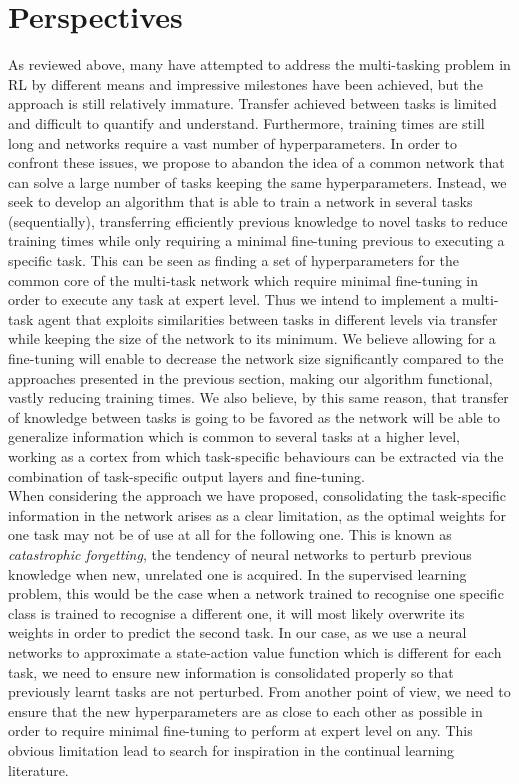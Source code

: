 \documentclass{article}
\begin{document}
\section{Perspectives}
As reviewed above, many have attempted to address the multi-tasking problem in RL by different means and impressive milestones have been achieved, but the approach is still relatively immature. Transfer achieved between tasks is limited and difficult to quantify and understand. Furthermore, training times are still long and networks require a vast number of hyperparameters. In order to confront these issues, we propose to abandon the idea of a common network that can solve a large number of tasks keeping the same hyperparameters. Instead, we seek to develop an algorithm that is able to train a network in several tasks (sequentially), transferring efficiently previous knowledge to novel tasks to reduce training times while only requiring a minimal fine-tuning previous to executing a specific task. This can be seen as finding a set of hyperparameters for the common core of the multi-task network which require minimal fine-tuning in order to execute any task at expert level. Thus we intend to implement a multi-task agent that exploits similarities between tasks in different levels via transfer while keeping the size of the network to its minimum. We believe allowing for a fine-tuning will enable to decrease the network size significantly compared to the approaches presented in the previous section, making our algorithm functional, vastly reducing training times. We also believe, by this same reason, that transfer of knowledge between tasks is going to be favored as the network will be able to generalize information which is common to several tasks at a higher level, working as a cortex from which task-specific behaviours can be extracted via the combination of task-specific output layers and fine-tuning.\\
\newline
When considering the approach we have proposed, consolidating the task-specific information in the network arises as a clear limitation, as the optimal weights for one task may not be of use at all for the following one. This is known as \textit{catastrophic forgetting}, the tendency of neural networks to perturb previous knowledge when new, unrelated one is acquired. In the supervised learning problem, this would be the case when a network trained to recognise one specific class is trained to recognise a different one, it will most likely overwrite its weights in order to predict the second task. In our case, as we use a neural networks to approximate a state-action value function which is different for each task, we need to ensure new information is consolidated properly so that previously learnt tasks are not perturbed. From another point of view, we need to ensure that the new hyperparameters are as close to each other as possible in order to require minimal fine-tuning to perform at expert level on any. This obvious limitation lead to search for inspiration in the continual learning literature.
\newpage
\end{document}
